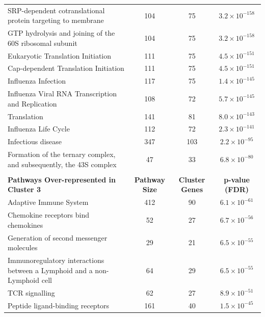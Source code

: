 \begin{table}[!hp]
{\begin{tabular}{lccc}
  \rowcolor{Cluster_Green!20} 
  SRP-dependent cotranslational protein targeting to membrane & 104 &  75 & $3.2 \times 10^{-158}$ \\
  \rowcolor{Cluster_Green!15} 
  GTP hydrolysis and joining of the 60S ribosomal subunit & 104 &  75 & $3.2 \times 10^{-158}$ \\
  \rowcolor{Cluster_Green!20} 
  Eukaryotic Translation Initiation & 111 &  75 & $4.5 \times 10^{-151}$ \\
  \rowcolor{Cluster_Green!15} 
  Cap-dependent Translation Initiation & 111 &  75 & $4.5 \times 10^{-151}$ \\
  \rowcolor{Cluster_Green!20} 
  Influenza Infection & 117 &  75 & $1.4 \times 10^{-145}$ \\
  \rowcolor{Cluster_Green!15} 
  Influenza Viral RNA Transcription and Replication & 108 &  72 & $5.7 \times 10^{-145}$ \\
  \rowcolor{Cluster_Green!20} 
  Translation & 141 &  81 & $8.0 \times 10^{-143}$ \\
  \rowcolor{Cluster_Green!15} 
  Influenza Life Cycle & 112 &  72 & $2.3 \times 10^{-141}$ \\
  \rowcolor{Cluster_Green!20} 
  Infectious disease & 347 & 103 & $2.2 \times 10^{-95}$ \\
  \rowcolor{Cluster_Green!15} 
  Formation of the ternary complex, and subsequently, the 43S complex &  47 &  33 & $6.8 \times 10^{-80}$ \\
  \hline
  \\
  \cellcolor{white} \large{\textbf{Pathways Over-represented in Cluster 3}} & \large{\textbf{Pathway Size}} & \large{\textbf{Cluster Genes}} & \large{\textbf{p-value (FDR)}} \\ %
  \hline
  \rowcolor{Cluster_Orange!30}
  Adaptive Immune System & 412 &  90 & $6.1 \times 10^{-61}$ \\
  \rowcolor{Cluster_Orange!20} 
  Chemokine receptors bind chemokines &  52 &  27 & $6.7 \times 10^{-56}$ \\
  \rowcolor{Cluster_Orange!30} 
  Generation of second messenger molecules &  29 &  21 & $6.5 \times 10^{-55}$ \\
  \rowcolor{Cluster_Orange!20} 
  Immunoregulatory interactions between a Lymphoid and a non-Lymphoid cell &  64 &  29 & $6.5 \times 10^{-55}$ \\
  \rowcolor{Cluster_Orange!30} 
  TCR signalling &  62 &  27 & $8.9 \times 10^{-51}$ \\
  \rowcolor{Cluster_Orange!20} 
  Peptide ligand-binding receptors & 161 &  40 & $1.5 \times 10^{-45}$ \\

\end{tabular}}
\end{table}

